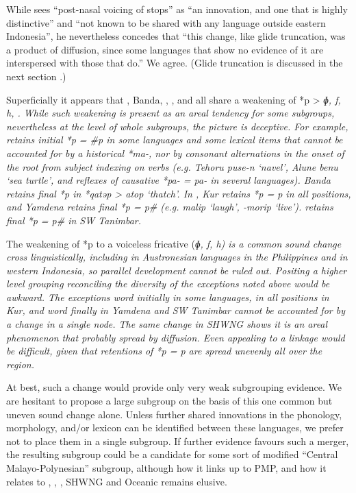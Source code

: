While \citet[72]{Blust2009} sees “post-nasal voicing of stops”
as “an innovation, and one that is highly distinctive”
and “not known to be shared with any language outside eastern
Indonesia”, he nevertheless concedes that “this change,
like glide truncation, was a product of diffusion,
since some languages that show no evidence of it are interspersed
with those that do.” We agree.
(Glide truncation is discussed in the next section .)

Superficially it appears that ,
Banda, , , and 
all share a weakening of *p > \it{ɸ, f, h}, {\0}.
While such weakening is present as an areal tendency for some
subgroups, nevertheless at the level of whole subgroups,
the picture is deceptive.
For example,  retains initial *p = \it{{\#}p} in
some languages and some lexical items that cannot be accounted for by a historical
*ma-, nor by consonant alternations in the onset of the root from subject
indexing on verbs (e.g.
Tehoru \it{puse-n} ‘navel’, Alune \it{benu} ‘sea turtle’,
and reflexes of causative *pa- = \it{pa-} in several languages).
Banda retains final *p in *qatəp > \it{atop} ‘thatch’.
In , Kur retains *p = \it{p} in all positions,
and Yamdena retains final *p = \it{p{\#}} (e.g.
\it{malip} ‘laugh’, \it{-morip} ‘live’).
 retains final *p = \it{p{\#}} in SW Tanimbar.

The weakening of *p to a voiceless fricative (\it{ɸ,
f, h}) is a common sound change cross linguistically,
including in Austronesian languages in the Philippines
and in western Indonesia,
so parallel development cannot be ruled out.
Positing a higher level grouping reconciling the diversity of
the exceptions noted above would be awkward.
The exceptions word initially in some  languages,
in all positions in Kur,
and word finally in Yamdena
and SW Tanimbar cannot be accounted for by a change in a single node.
The same change in SHWNG shows it is an areal phenomenon that
probably spread by diffusion.
Even appealing to a linkage would be difficult,
given that retentions of *p = \it{p} are spread unevenly all over the region.

At best, such a change would provide only very weak subgrouping evidence.
We are hesitant to propose a large subgroup on the basis of this
one common but uneven sound change alone.
Unless further shared innovations in the phonology,
morphology, and/or lexicon can be identified between these languages,
we prefer not to place them in a single subgroup.
If further evidence favours such a merger,
the resulting subgroup could be a candidate for some sort of
modified “Central Malayo-Polynesian” subgroup,
although how it links up to PMP,
and how it relates to ,
, , SHWNG and Oceanic remains elusive.


